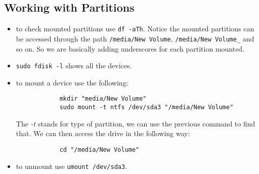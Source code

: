 \documentclass[a4paper, 12pt]{article}
\begin{document}
\subsection{Working with Partitions}
\begin{itemize}
	\item to check mounted partitions use \verb|df -aTh|. Notice the mounted partitions can be accessed through the path \verb|/media/New Volume|, \verb|/media/New Volume_| and so on. So we are basically adding underscores for each partition mounted.
	\item \verb|sudo fdisk -l| shows all the devices.
	\item to mount a device use the following:
		\begin{verbatim}
			mkdir "media/New Volume"
			sudo mount -t ntfs /dev/sda3 "/media/New Volume"
		\end{verbatim}
		The \emph{-t} stands for type of partition, we can use the previous command to find that. We can then access the drive in the following way:
		\begin{verbatim}
			cd "/media/New Volume"
		\end{verbatim}
	\item to unmount use \verb|umount /dev/sda3|.
\end{itemize}
\end{document}
